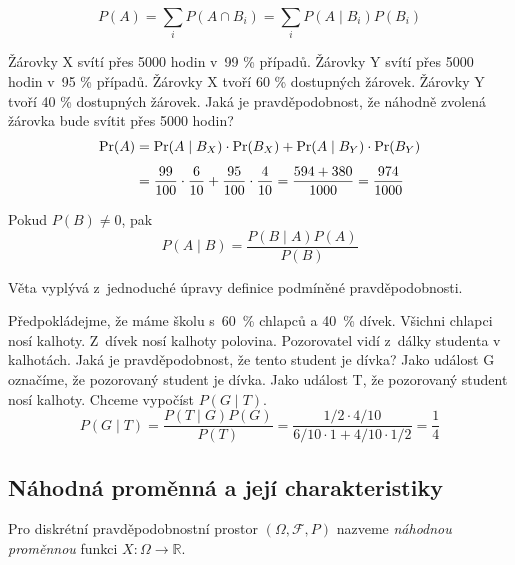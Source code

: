 \begin{theorem}
    \[
        P(A) = \sum_i P(A \cap B_i) = \sum_i P(A \mid B_i) P(B_i)
    \]
\end{theorem}

\begin{example}
    Žárovky X svítí přes 5000 hodin v~99 \% případů.
    Žárovky Y svítí přes 5000 hodin v~95 \% případů.
    Žárovky X tvoří 60 \% dostupných žárovek.
    Žárovky Y tvoří 40 \% dostupných žárovek.
    Jaká je pravděpodobnost, že náhodně zvolená žárovka
    bude svítit přes 5000 hodin?
    \[
{\displaystyle {\begin{aligned}\Pr(A)&=\Pr(A\mid B_{X})\cdot \Pr(B_{X})+\Pr(A\mid B_{Y})\cdot \Pr(B_{Y})\\[4pt]&={99 \over 100}\cdot {6 \over 10}+{95 \over 100}\cdot {4 \over 10}={{594+380} \over 1000}={974 \over 1000}\end{aligned}}}
\]
\end{example}

\begin{theorem}[Bayes]
    Pokud $P(B) \neq 0$, pak
    \[
    P(A \mid B) = \frac{P(B \mid A)P(A)}{P(B)}
    \]
\end{theorem}

Věta vyplývá z~jednoduché úpravy definice podmíněné pravděpodobnosti.

\begin{example}
Předpokládejme, že máme školu s~60~\% chlapců
a 40~\% dívek. Všichni chlapci nosí kalhoty.
Z~dívek nosí kalhoty polovina. Pozorovatel vidí z~dálky studenta v kalhotách.
Jaká je pravděpodobnost, že tento student je dívka?
Jako událost G označíme, že pozorovaný student je dívka. Jako událost T,
že pozorovaný student nosí kalhoty. Chceme vypočíst $P(G \mid T)$.
\[
    P(G \mid T)
    = \frac{P(T \mid G)P(G)}{P(T)}
    = \frac{1/2 \cdot 4/10}{6/10 \cdot 1 + 4/10 \cdot 1/2}
	= \frac{1}{4}
\]
\end{example}

\subsection{Náhodná proměnná a její charakteristiky}

\begin{definition}
    Pro diskrétní pravděpodobnostní prostor $(\Omega, \mathcal{F}, P)$
    nazveme {\em náhodnou proměnnou} funkci $X : \Omega \to \mathbb{R}$.
\end{definition}

